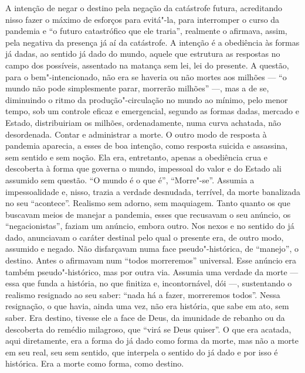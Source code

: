 A intenção de negar o destino pela negação da catástrofe futura,
acreditando nisso fazer o máximo de esforços para evitá"-la, para
interromper o curso da pandemia e ``o futuro catastrófico que ele
traria'', realmente o afirmava, assim, pela negativa da presença já aí
da catástrofe. A intenção é a obediência às formas já dadas, ao sentido
já dado do mundo, aquele que estrutura as respostas no campo dos
possíveis, assentado na matança sem lei, lei do presente. A questão,
para o bem"-intencionado, não era se haveria ou não mortes aos milhões
--- ``o mundo não pode simplesmente parar, morrerão milhões'' ---, mas a
de se, diminuindo o ritmo da produção"-circulação no mundo ao mínimo,
pelo menor tempo, sob um controle eficaz e emergencial, segundo as
formas dadas, mercado e Estado, distribuiriam os milhões, ordenadamente,
numa curva achatada, não desordenada. Contar e administrar a morte. O
outro modo de resposta à pandemia aparecia, a esses de boa intenção,
como resposta suicida e assassina, sem sentido e sem noção. Ela era,
entretanto, apenas a obediência crua e descoberta à forma que governa o
mundo, impessoal do valor e do Estado ali assumido sem questão. ``O
mundo é o que é'', ``Morre"-se''. Assumia a impessoalidade e, nisso,
trazia a verdade desnudada, terrível, da morte banalizada no seu
``acontece''. Realismo sem adorno, sem maquiagem. Tanto quanto os que
buscavam meios de manejar a pandemia, esses que recusavam o seu anúncio,
os ``negacionistas'', faziam um anúncio, embora outro. Nos nexos e no
sentido do já dado, anunciavam o caráter destinal pelo qual o presente
era, de outro modo, assumido e negado. Não disfarçavam numa face
pseudo"-histórica, de ``manejo'', o destino. Antes o afirmavam num
``todos morreremos'' universal. Esse anúncio era também
pseudo"-histórico, mas por outra via. Assumia uma verdade da morte ---
essa que funda a história, no que finitiza e, incontornável, dói ---,
sustentando o realismo resignado ao seu saber: ``nada há a fazer,
morreremos todos''. Nessa resignação, o que havia, ainda uma vez, não
era história, que sabe em ato, sem saber. Era destino, tivesse ele a
face de Deus, da imunidade de rebanho ou da descoberta do remédio
milagroso, que ``virá se Deus quiser''. O que era acatada, aqui
diretamente, era a forma do já dado como forma da morte, mas não a morte
em seu real, seu sem sentido, que interpela o sentido do já dado e por
isso é histórica. Era a morte como forma, como destino.

